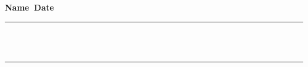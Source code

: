 \documentclass[10pt,letterpaper]{article}
\begin{document}
{\bf Name\ \underline{\hskip 200pt}\hskip 130pt}{\bf Date\
\underline{\hskip 150pt}}

\vskip 1cm

{
\vskip 10pt
\rule[1.75ex]{7.5in}{1pt}
\\
\hdashrule{7.75in}{1pt}{4mm}
\\
\rule[-1.75ex]{7.5in}{1pt}
\\[2mm]
}
%
\end{document}
